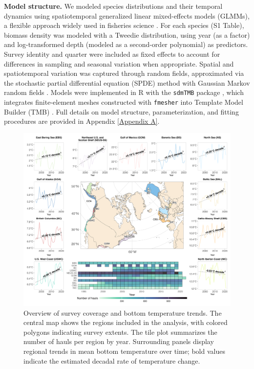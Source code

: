 \documentclass[lineno,pdflatex,sn-nature]{sn-jnl}%
\begin{document}
\textbf{Model structure.} We modeled species distributions and their temporal dynamics using spatiotemporal generalized linear mixed-effects models (GLMMs), a flexible approach widely used in fisheries science \citep{thorson_geostatistical_2015, thorson_model-based_2016}. For each species (S1 Table), biomass density was modeled with a Tweedie distribution, using year (as a factor) and log-transformed depth (modeled as a second-order polynomial) as predictors. Survey identity and quarter were included as fixed effects to account for differences in sampling and seasonal variation when appropriate. Spatial and spatiotemporal variation was captured through random fields, approximated via the stochastic partial differential equation (SPDE) method with Gaussian Markov random fields \citep{lindgren_explicit_2011}. Models were implemented in R with the \texttt{sdmTMB} package \citep{anderson_sdmtmb_2024}, which integrates finite-element meshes constructed with \texttt{fmesher} \citep{lindgren_fmesher_2025} into Template Model Builder (TMB) \citep{kristensen_tmb_2016}. Full details on model structure, parameterization, and fitting procedures are provided in Appendix \ref{Appendix A}.


\begin{figure}[h]
\centering
\includegraphics[width=1\textwidth]{output/figures/main/map.png}
\caption{Overview of survey coverage and bottom temperature trends.
The central map shows the regions included in the analysis, with colored polygons indicating survey extents. The tile plot summarizes the number of hauls per region by year. Surrounding panels display regional trends in mean bottom temperature over time; bold values indicate the estimated decadal rate of temperature change.}\label{fig:map}
\end{figure}
\end{document}
